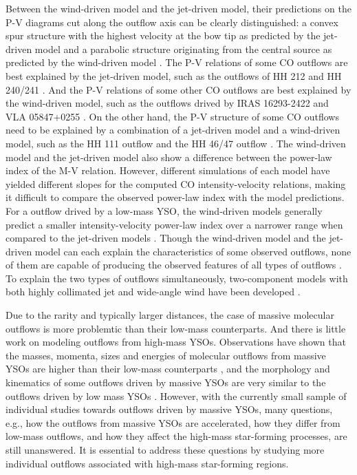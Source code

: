 Between the wind-driven model and the jet-driven model, their predictions on the P-V diagrams cut along the outflow axis can be clearly distinguished: a convex spur structure with the highest velocity at the bow tip as predicted by the jet-driven model and a parabolic structure originating from the central source as predicted by the wind-driven model \citep{2001ApJ...557..429L}. The P-V relations of some CO outflows are best explained by the jet-driven model, such as the outflows of HH 212 and HH 240/241 \citep{2000ApJ...542..925L}. And the P-V relations of some other CO outflows are best explained by the wind-driven model, such as the outflows drived by IRAS 16293-2422 \citep{2008ApJ...675..454Y} and VLA 05847+0255 \citep{2000ApJ...542..925L}. On the other hand, the P-V structure of some CO outflows need to be explained by a combination of a jet-driven model and a wind-driven model, such as the HH 111 outflow \citep{2000ApJ...542..925L} and the HH 46/47 outflow \citep{2013ApJ...774...39A}. The wind-driven model and the jet-driven model also show a difference between the power-law index of the M-V relation. However, different simulations of each model have yielded different slopes for the computed CO intensity-velocity relations, making it difficult to compare the observed power-law index with the model predictions. For a outflow drived by a low-mass YSO, the wind-driven models generally predict a smaller intensity-velocity power-law index over a narrower range when compared to the jet-driven models \citep{2007prpl.conf..245A}. Though the wind-driven model and the jet-driven model can each explain the characteristics of some observed outflows, none of them are capable of producing the observed features of all types of outflows \citep{2002ApJ...576..294L}. To explain the two types of outflows simultaneously, two-component models with both highly collimated jet and wide-angle wind have been developed \citep{2000prpl.conf..789S, 2006ApJ...641..949B, 2006MNRAS.365.1131P, 2006ApJ...649..845S, 2007prpl.conf..277P, 2008ApJ...676.1088M, 2017arXiv171100384M}.

Due to the rarity and typically larger distances, the case of massive molecular outflows is more problemtic than their low-mass counterparts. And there is little work on modeling outflows from high-mass YSOs. Observations have shown that the masses, momenta, sizes and energies of molecular outflows from massive YSOs are higher than their low-mass counterparts \citep{2002A&A...383..892B, 2005AJ....129..330W}, and the morphology and kinematics of some outflows driven by massive YSOs are very similar to the outflows driven by low mass YSOs \citep[][]{1998ApJ...507..861S, 2002A&A...387..931B, 2008A&A...485..137C, 2009ApJ...696...66Q, 2011MNRAS.415L..49R, 2012ApJ...744L..26S}. However, with the currently small sample of individual studies towards outflows driven by massive YSOs, many questions, e.g., how the outflows from massive YSOs are accelerated, how they differ from low-mass outflows, and how they affect the high-mass star-forming processes, are still unanswered. It is essential to address these questions by studying more individual outflows associated with high-mass star-forming regions. 


